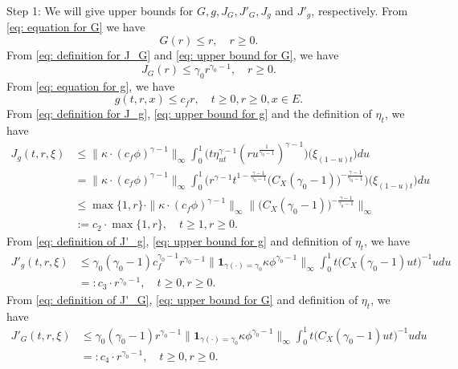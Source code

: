 \documentclass[12pt, a4paper]{amsart}
\theoremstyle{definition}
\numberwithin{equation}{section}
\begin{document}
	Step 1: We will give upper bounds for $G,g,J_G,J'_G,J_g$ and $J'_g$, respectively.
	From \eqref{eq: equation for G} we have
\[\label{eq: upper bound for G}
	G(r)
	\leq r,
	\quad r \geq 0.
\]	
	From \eqref{eq: definition for J_G} and \eqref{eq: upper bound for G}, we have
\[\label{eq: upper bound for J_G}
	J_G(r)
	\leq \gamma_0 r^{\gamma_0 - 1},
	\quad r \geq 0.
\]
	From \eqref{eq: equation for g}, we have
\[\label{eq: upper bound for g}
	g(t,r, x) \leq c_f r,
	\quad t\geq 0, r \geq 0, x\in E.
\]
	From \eqref{eq: definition for J_g}, \eqref{eq: upper bound for g} and the definition of $\eta_t$, we have
\[\begin{split}
	J_g(t,r, \xi)
	&\leq \|\kappa \cdot (c_f\phi)^{\gamma - 1} \|_\infty \int_0^1 \big(  t\eta_{ut}^{\gamma - 1} (ru^{\frac{1}{\gamma_0 - 1}} )^{\gamma-1}  \big) \big(  \xi_{(1-u)t} \big) du
	\\&= \| \kappa \cdot (c_f\phi)^{\gamma - 1} \|_\infty \int_0^1 \big(  r^{\gamma - 1}t^{1-\frac{\gamma - 1}{\gamma_0 - 1}}  \big( C_X (\gamma_0 - 1) \big)^{-\frac{\gamma - 1}{\gamma_0 - 1}}  \big) \big( \xi_{(1-u)t} \big) du
	\\& \leq \max\{1,r\} \cdot \| \kappa \cdot (c_f\phi)^{\gamma - 1} \|_\infty \Big\|  \big( C_X (\gamma_0 - 1) \big)^{-\frac{\gamma - 1}{\gamma_0 - 1}}\Big\|_\infty
	\\& := c_2 \cdot \max  \{1,r\},
	\quad t\geq 1, r\geq 0.
\end{split}\]
	From \eqref{eq: definition of J'_g}, \eqref{eq: upper bound for g} and definition of $\eta_t$, we have
\[\begin{split}
	J'_g(t,r,\xi)
	&\leq \gamma_0(\gamma_0 - 1) c_f^{\gamma_0 - 1}r^{\gamma_0 - 1} \|  \mathbf 1_{\gamma(\cdot) = \gamma_0}  \kappa \phi^{\gamma_0 - 1} \|_\infty \int_0^1 t \big( C_X(\gamma_0 - 1) ut \big)^{- 1}  u  du
	\\&=: c_3 \cdot r^{\gamma_0 - 1},
	\quad t\geq 0, r\geq 0.
\end{split}\]
	From \eqref{eq: definition of J'_G}, \eqref{eq: upper bound for G} and definition of $\eta_t$, we have
\[\label{eq: upper bound for J'_G} \begin{split}
	J'_G(t,r,\xi)
	&\leq \gamma_0(\gamma_0 - 1) r^{\gamma_0 - 1} \big\|   \mathbf 1_{\gamma(\cdot) = \gamma_0}  \kappa \phi^{\gamma_0 - 1} \big\|_\infty \int_0^1 t \big(  C_X(\gamma_0 - 1) ut \big)^{- 1}  u  du
	\\&=: c_4 \cdot r^{\gamma_0 - 1},
	\quad t\geq 0, r\geq 0.
\end{split}\]
\end{document}
